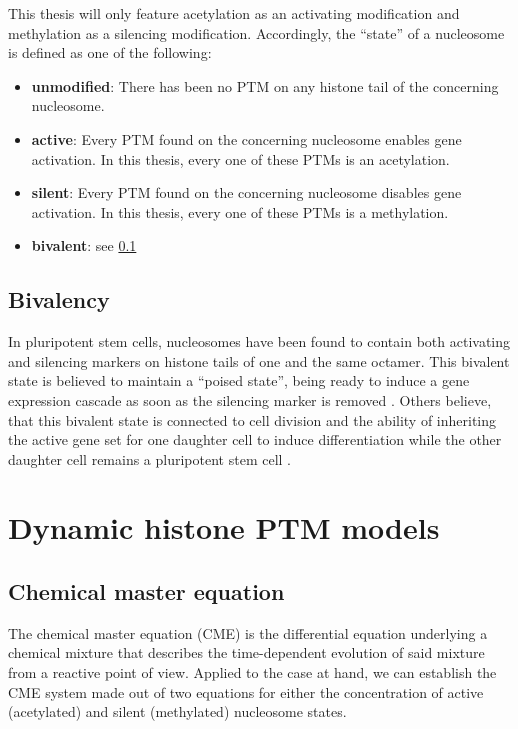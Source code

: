             This thesis will only feature acetylation as an activating modification and methylation as a silencing modification. Accordingly, the “state” of a nucleosome is defined as one of the following:

            \begin{itemize}
                \item \textbf{unmodified}: There has been no PTM on any histone tail of the concerning nucleosome.
                \item \textbf{active}: Every PTM found on the concerning nucleosome enables gene activation. In this thesis, every one of these PTMs is an acetylation.
                \item \textbf{silent}: Every PTM found on the concerning nucleosome disables gene activation. In this thesis, every one of these PTMs is a methylation.
                \item \textbf{bivalent}: see \ref{sec:TheoryBivalency}
            \end{itemize}
        \subsection{Bivalency}
            \label{sec:TheoryBivalency}
            In pluripotent stem cells, nucleosomes have been found to contain both activating and silencing markers on histone tails of one and the same octamer. This bivalent state is believed to maintain a “poised state”, being ready to induce a gene expression cascade as soon as the silencing marker is removed \cite{lesch2014poised,bernhart2016changes}. %
            Others believe, that this bivalent state is connected to cell division and the ability of inheriting the active gene set for one daughter cell to induce differentiation while the other daughter cell remains a pluripotent stem cell \cite{schuettengruber2017genome}. %
    \section{Dynamic histone PTM models}
        \subsection{Chemical master equation}
        \label{subsec:CME}
            The chemical master equation (CME) is the differential equation underlying a chemical mixture that describes the time-dependent evolution of said mixture from a reactive point of view. Applied to the case at hand, we can establish the CME system made out of two equations for either the concentration of active (acetylated) and silent (methylated) nucleosome states.

